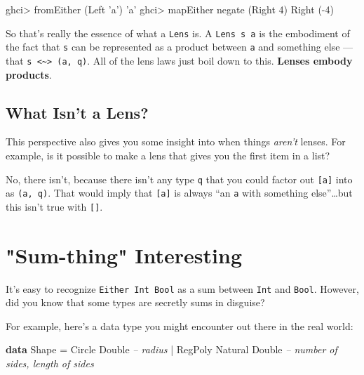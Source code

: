 \documentclass[]{article}
\newenvironment{Shaded}{}{}
\newcommand{\CharTok}[1]{\textcolor[rgb]{0.25,0.44,0.63}{#1}}
\newcommand{\CommentTok}[1]{\textcolor[rgb]{0.38,0.63,0.69}{\textit{#1}}}
\newcommand{\DataTypeTok}[1]{\textcolor[rgb]{0.56,0.13,0.00}{#1}}
\newcommand{\DecValTok}[1]{\textcolor[rgb]{0.25,0.63,0.44}{#1}}
\newcommand{\FunctionTok}[1]{\textcolor[rgb]{0.02,0.16,0.49}{#1}}
\newcommand{\KeywordTok}[1]{\textcolor[rgb]{0.00,0.44,0.13}{\textbf{#1}}}
\newcommand{\NormalTok}[1]{#1}
\begin{document}
\begin{Shaded}
\begin{Highlighting}[]
\NormalTok{ghci}\FunctionTok{>}\NormalTok{ fromEither (}\DataTypeTok{Left} \CharTok{'a'}\NormalTok{)}
\CharTok{'a'}
\NormalTok{ghci}\FunctionTok{>}\NormalTok{ mapEither negate (}\DataTypeTok{Right} \DecValTok{4}\NormalTok{)}
\DataTypeTok{Right}\NormalTok{ (}\FunctionTok{-}\DecValTok{4}\NormalTok{)}
\end{Highlighting}
\end{Shaded}

So that's really the essence of what a \texttt{Lens\textquotesingle{}} is. A
\texttt{Lens\textquotesingle{}\ s\ a} is the embodiment of the fact that
\texttt{s} can be represented as a product between \texttt{a} and something else
--- that \texttt{s\ \textless{}\textasciitilde{}\textgreater{}\ (a,\ q)}. All of
the lens laws just boil down to this. \textbf{Lenses embody products}.

\hypertarget{what-isnt-a-lens}{%
\subsection{What Isn't a Lens?}\label{what-isnt-a-lens}}

This perspective also gives you some insight into when things \emph{aren't}
lenses. For example, is it possible to make a lens that gives you the first item
in a list?

No, there isn't, because there isn't any type \texttt{q} that you could factor
out \texttt{{[}a{]}} into as \texttt{(a,\ q)}. That would imply that
\texttt{{[}a{]}} is always ``an \texttt{a} with something else''\ldots{}but this
isn't true with \texttt{{[}{]}}.

\hypertarget{sum-thing-interesting}{%
\section{"Sum-thing" Interesting}\label{sum-thing-interesting}}

It's easy to recognize \texttt{Either\ Int\ Bool} as a sum between \texttt{Int}
and \texttt{Bool}. However, did you know that some types are secretly sums in
disguise?

For example, here's a data type you might encounter out there in the real world:

\begin{Shaded}
\begin{Highlighting}[]
\KeywordTok{data} \DataTypeTok{Shape} \FunctionTok{=} \DataTypeTok{Circle}  \DataTypeTok{Double}           \CommentTok{-- radius}
           \FunctionTok{|} \DataTypeTok{RegPoly} \DataTypeTok{Natural} \DataTypeTok{Double}   \CommentTok{-- number of sides, length of sides}
\end{Highlighting}
\end{Shaded}
\end{document}
